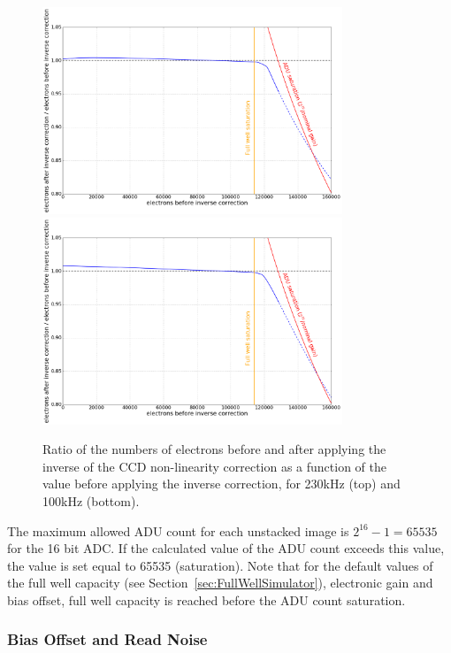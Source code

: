 \documentclass[11pt]{article}      %
\begin{document}
\begin{figure}[hbtp]
  \begin{center}
    \includegraphics[width=0.8\textwidth]{ccdNonLinearity3_2018.png}
    \includegraphics[width=0.8\textwidth]{ccdNonLinearity3_100kHz_2018.png}
    \caption{Ratio of the numbers of electrons before and after applying the inverse of the CCD non-linearity correction as a function of the value before applying the inverse correction, for 230kHz (top) and 100kHz (bottom).}
    \label{fig:ccdNonLinearity3}
  \end{center}
\end{figure}

The maximum allowed ADU count for each unstacked image is $2^{16}-1=65535$ for the 16 bit ADC. If the calculated value of the ADU count exceeds this value, the value is set equal to 65535 (saturation).  Note that for the default values of the full well capacity (see Section~\ref{sec:FullWellSimulator}), electronic gain and bias offset, full well capacity is reached before the ADU count saturation.

\clearpage
\subsubsection{Bias Offset and Read Noise}
\label{sec:biasoffset}
\end{document}
